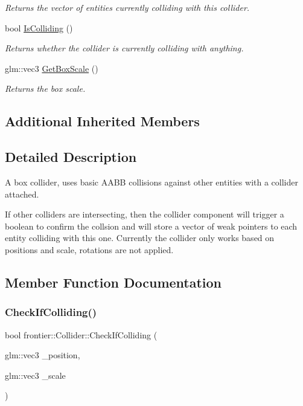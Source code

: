 \begin{DoxyCompactItemize}
\begin{DoxyCompactList}\small\item\em Returns the vector of entities currently colliding with this collider. \end{DoxyCompactList}\item 
bool \hyperlink{classfrontier_1_1_collider_abcc4976d3ac48d591a0e725fb457260a}{Is\+Colliding} ()
\begin{DoxyCompactList}\small\item\em Returns whether the collider is currently colliding with anything. \end{DoxyCompactList}\item 
glm\+::vec3 \hyperlink{classfrontier_1_1_collider_a2f8285a81d952b72bf0a02703f7d3481}{Get\+Box\+Scale} ()
\begin{DoxyCompactList}\small\item\em Returns the box scale. \end{DoxyCompactList}\end{DoxyCompactItemize}
\subsection*{Additional Inherited Members}


\subsection{Detailed Description}
A box collider, uses basic A\+A\+BB collisions against other entities with a collider attached. 

If other colliders are intersecting, then the collider component will trigger a boolean to confirm the collsion and will store a vector of weak pointers to each entity colliding with this one. Currently the collider only works based on positions and scale, rotations are not applied. 

\subsection{Member Function Documentation}
\mbox{\label{classfrontier_1_1_collider_aa0269702eb2d87a12087e933821ad6e0}} 
\subsubsection{\texorpdfstring{Check\+If\+Colliding()}{CheckIfColliding()}}
{\footnotesize\ttfamily bool frontier\+::\+Collider\+::\+Check\+If\+Colliding (\begin{DoxyParamCaption}\item[{glm\+::vec3}]{\+\_\+position,  }\item[{glm\+::vec3}]{\+\_\+scale }\end{DoxyParamCaption})}




